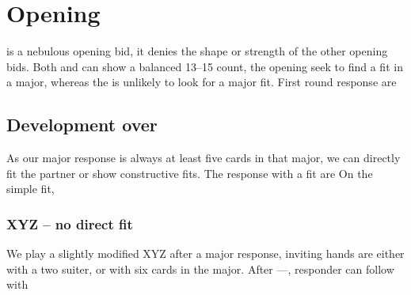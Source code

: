 \chapter{\bid{1\DS} Opening}
\bid{1\DS} is a nebulous opening bid, it denies the shape or strength of the other opening bids. Both \bid{1\NT} and \bid{1\DS} can show a balanced 13–15 count, the \bid{1\DS} opening seek to find a fit in a major, whereas the \bid{1\NT}
 is unlikely to look for a major fit. First round response are
\section{Development over \bid{1\HS/\SpS}}
As our major response is always at least five cards in that major, we can directly fit the partner or show constructive fits. The response with a fit are
On the simple fit, 
\subsection{XYZ – no direct fit}
We play a slightly modified XYZ after a major response, inviting hands are either with a two suiter, or with six cards in the major. After \bid{1\DS}––\bid{1\NT}, responder can follow with

